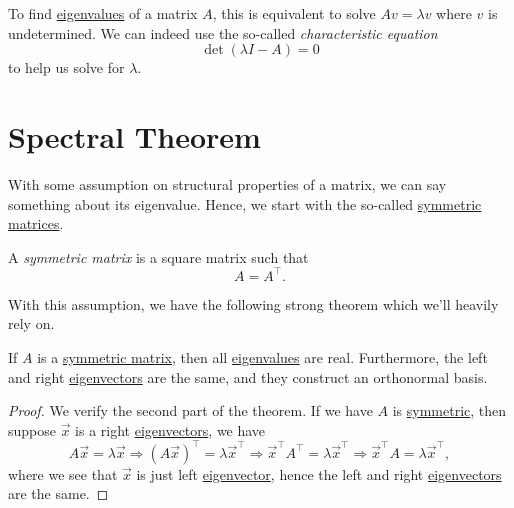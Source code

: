 \begin{note}\label{note:characteristic-equation}
	To find \hyperref[def:eigenvalue]{eigenvalues} of a matrix \(A\), this is equivalent to solve \(Av = \lambda v\) where \(v\) is undetermined. We can indeed use
	the so-called \emph{characteristic equation}
	\[
		\det(\lambda I - A) = 0
	\]
	to help us solve for \(\lambda \).
\end{note}

\section{Spectral Theorem}
With some assumption on structural properties of a matrix, we can say something about its eigenvalue. Hence, we start with the so-called
\hyperref[def:symmetric-matrix]{symmetric matrices}.

\begin{definition}\label{def:symmetric-matrix}
	A \emph{symmetric matrix} is a square matrix such that
	\[
		A = A^{\top}.
	\]
\end{definition}

With this assumption, we have the following strong theorem which we'll heavily rely on.

\begin{theorem}\label{thm:spectral-theorem}
	If \(A\) is a \hyperref[def:symmetric-matrix]{symmetric matrix}, then all \hyperref[def:eigenvalue]{eigenvalues} are real. Furthermore, the left and right
	\hyperref[def:eigenvector]{eigenvectors} are the same, and they construct an orthonormal basis.
\end{theorem}
\begin{proof}
	We verify the second part of the theorem.  If we have \(A\) is \hyperref[def:symmetric-matrix]{symmetric}, then suppose \(\vec{x} \) is a
	right \hyperref[def:eigenvector]{eigenvectors}, we have
	\[
		A \vec{x} = \lambda \vec{x}\Rightarrow
		(A \vec{x})^{\top} = \lambda \vec{x}^{\top}\Rightarrow
		\vec{x}^{\top} A^{\top} = \lambda\vec{x}^{\top}\Rightarrow
		\vec{x}^{\top} A = \lambda\vec{x}^{\top},
	\]
	where we see that \(\vec{x}\) is just left \hyperref[def:eigenvector]{eigenvector}, hence the left and right \hyperref[def:eigenvector]{eigenvectors} are the same.
\end{proof}